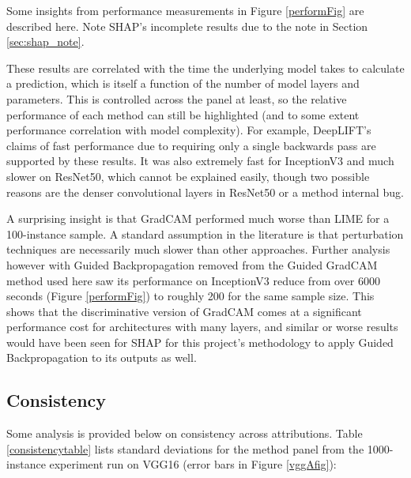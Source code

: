 \documentclass[main]{subfiles}
\begin{document}
Some insights from performance measurements in Figure \ref{performFig} are described here. Note SHAP's incomplete results due to the note in Section \ref{sec:shap_note}.

These results are correlated with the time the underlying model takes to calculate a prediction, which is itself a function of the number of model layers and parameters. This is controlled across the panel at least, so the relative performance of each method can still be highlighted (and to some extent performance correlation with model complexity). For example, DeepLIFT's claims of fast performance due to requiring only a single backwards pass are supported by these results. It was also extremely fast for InceptionV3 and much slower on ResNet50, which cannot be explained easily, though two possible reasons are the denser convolutional layers in ResNet50 or a method internal bug.

A surprising insight is that GradCAM performed much worse than LIME for a 100-instance sample. A standard assumption in the literature is that perturbation techniques are necessarily much slower than other approaches. Further analysis however with Guided Backpropagation removed from the Guided GradCAM method used here saw its performance on InceptionV3 reduce from over 6000 seconds (Figure \ref{performFig}) to roughly 200 for the same sample size. This shows that the discriminative version of GradCAM comes at a significant performance cost for architectures with many layers, and similar or worse results would have been seen for SHAP for this project's methodology to apply Guided Backpropagation to its outputs as well.


\newpage
\subsection{Consistency}\label{sec:consistency}
Some analysis is provided below on consistency across attributions. Table \ref{consistencytable} lists standard deviations for the method panel from the 1000-instance experiment run on VGG16 (error bars in Figure \ref{vggAfig}):
\end{document}
